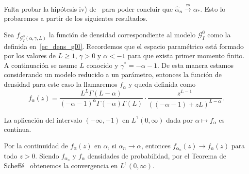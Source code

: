 Falta probar la hipótesis iv) de~\cite{parr1982} para poder concluir que $\widehat{\alpha}_n \stackrel{cs}{\longrightarrow} \alpha_*$. Esto lo probaremos a partir de los siguientes resultados.

Sea $f_{\mathcal{G}_I^0(\alpha,\gamma,L)}$ la función de densidad correspondiente al modelo $\mathcal{G}_I^0$ como la definida en~\ref{ec_dens_gI0}. Recordemos que el espacio paramétrico está formado por los valores de $L\geq 1$, $\gamma>0$ y $\alpha<-1$ para que exista primer momento finito. 
A continuación se asume $L$ conocido y $\gamma^* = -\alpha-1$. De esta manera estamos considerando un modelo reducido a un parámetro, entonces la función de densidad para este caso la llamaremos $f_{\alpha}$ y queda definida como
\begin{equation}
f_{\alpha}( z) =\frac{L^{L}\Gamma ( L-\alpha
	) }{(-\alpha-1) ^{\alpha }\Gamma ( -\alpha ) \Gamma (
	L) }\cdot  
\frac{z^{L-1}}{((-\alpha-1) +zL) ^{L-\alpha }}.
\label{modeloreducido}
\end{equation}

\begin{proposition}
	\label{continuidad}
	La aplicación del intervalo $(-\infty,-1)$ en $L^{1}(0,\infty)$ dada por
	$\alpha \mapsto f_{\alpha}$ es continua.
\end{proposition}
\begin{dem}
	Por la continuidad de $f_{\alpha}(z)$ en $\alpha$, si $\alpha_{n} \to \alpha$, 
	entonces $f_{\alpha_{n}}(z) \to f_{\alpha}(z)$ para todo $z>0$.
	Siendo $f_{\alpha_{n}}$ y $f_{\alpha}$ densidades de probabilidad, por el Teorema de Scheffé~\cite{scheffe1947} obtenemos
	la convergencia en $L^{1}(0,\infty)$.
\end{dem}

